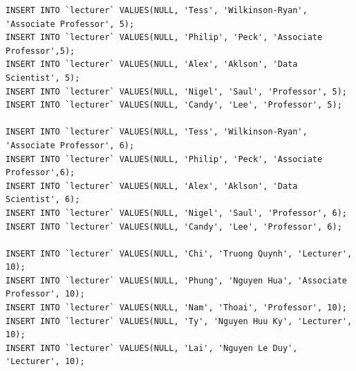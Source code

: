 \documentclass[12pt,a4paper,titlepage]{article}
\begin{document}
\begin{lstlisting}
INSERT INTO `lecturer` VALUES(NULL, 'Tess', 'Wilkinson-Ryan', 'Associate Professor', 5);
INSERT INTO `lecturer` VALUES(NULL, 'Philip', 'Peck', 'Associate Professor',5);
INSERT INTO `lecturer` VALUES(NULL, 'Alex', 'Aklson', 'Data Scientist', 5);
INSERT INTO `lecturer` VALUES(NULL, 'Nigel', 'Saul', 'Professor', 5);
INSERT INTO `lecturer` VALUES(NULL, 'Candy', 'Lee', 'Professor', 5);

INSERT INTO `lecturer` VALUES(NULL, 'Tess', 'Wilkinson-Ryan', 'Associate Professor', 6);
INSERT INTO `lecturer` VALUES(NULL, 'Philip', 'Peck', 'Associate Professor',6);
INSERT INTO `lecturer` VALUES(NULL, 'Alex', 'Aklson', 'Data Scientist', 6);
INSERT INTO `lecturer` VALUES(NULL, 'Nigel', 'Saul', 'Professor', 6);
INSERT INTO `lecturer` VALUES(NULL, 'Candy', 'Lee', 'Professor', 6);

INSERT INTO `lecturer` VALUES(NULL, 'Chi', 'Truong Quynh', 'Lecturer', 10);
INSERT INTO `lecturer` VALUES(NULL, 'Phung', 'Nguyen Hua', 'Associate Professor', 10);
INSERT INTO `lecturer` VALUES(NULL, 'Nam', 'Thoai', 'Professor', 10);
INSERT INTO `lecturer` VALUES(NULL, 'Ty', 'Nguyen Huu Ky', 'Lecturer', 10);
INSERT INTO `lecturer` VALUES(NULL, 'Lai', 'Nguyen Le Duy', 'Lecturer', 10);


\end{lstlisting}
\end{document}

